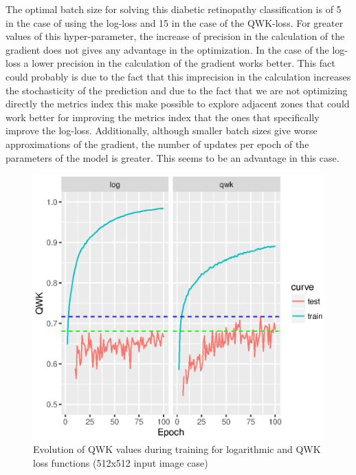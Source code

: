 \documentclass[times,twocolumn,final,authoryear]{elsarticle}
\begin{document}
The optimal batch size for solving this diabetic retinopathy classification is of 5 in the case of using the log-loss and 15 in the case of the QWK-loss. For greater values of this hyper-parameter, the increase of precision in the calculation of the gradient does not gives any advantage in the optimization. In the case of the log-loss a lower precision in the calculation of the gradient works better. This fact could probably is due to the fact that this imprecision in the calculation increases the stochasticity of the prediction and due to the fact that we are not optimizing directly the metrics index this make possible to explore adjacent zones that could work better for improving the metrics index that the ones that specifically improve the log-loss. Additionally, although smaller batch sizes give worse approximations of the gradient, the number of updates per epoch of the parameters of the model is greater. This seems to be an advantage in this case.



\begin{figure}[!htb]
	\centering
	\includegraphics[scale=.70]{training-curves.eps}
	\caption{Evolution of QWK values during training for logarithmic and QWK loss functions (512x512 input image case)}
	\label{fig:training-curves}
\end{figure}
\end{document}

